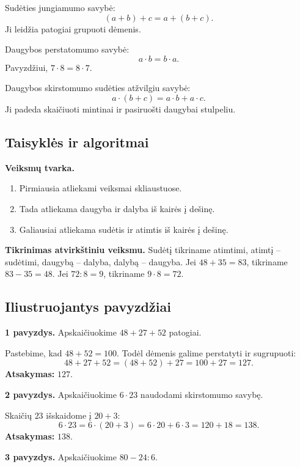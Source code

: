 \begin{savybe}
Sudėties jungiamumo savybė:
\[
(a+b)+c=a+(b+c).
\]
Ji leidžia patogiai grupuoti dėmenis.
\end{savybe}

\begin{savybe}
Daugybos perstatomumo savybė:
\[
a\cdot b=b\cdot a.
\]
Pavyzdžiui, \(7\cdot 8=8\cdot 7\).
\end{savybe}

\begin{savybe}
Daugybos skirstomumo sudėties atžvilgiu savybė:
\[
a\cdot(b+c)=a\cdot b+a\cdot c.
\]
Ji padeda skaičiuoti mintinai ir pasiruošti daugybai stulpeliu.
\end{savybe}

\subsection{Taisyklės ir algoritmai}

\textbf{Veiksmų tvarka.}
\begin{enumerate}[label=\arabic*.]
\item Pirmiausia atliekami veiksmai skliaustuose.
\item Tada atliekama daugyba ir dalyba iš kairės į dešinę.
\item Galiausiai atliekama sudėtis ir atimtis iš kairės į dešinę.
\end{enumerate}

\textbf{Tikrinimas atvirkštiniu veiksmu.}
Sudėtį tikriname atimtimi, atimtį -- sudėtimi, daugybą -- dalyba, dalybą -- daugyba. Jei \(48+35=83\), tikriname \(83-35=48\). Jei \(72:8=9\), tikriname \(9\cdot8=72\).

\subsection{Iliustruojantys pavyzdžiai}

\textbf{1 pavyzdys.} Apskaičiuokime \(48+27+52\) patogiai.

Pastebime, kad \(48+52=100\). Todėl dėmenis galime perstatyti ir sugrupuoti:
\[
48+27+52=(48+52)+27=100+27=127.
\]
\textbf{Atsakymas:} \(127\).

\textbf{2 pavyzdys.} Apskaičiuokime \(6\cdot 23\) naudodami skirstomumo savybę.

Skaičių \(23\) išskaidome į \(20+3\):
\[
6\cdot23=6\cdot(20+3)=6\cdot20+6\cdot3=120+18=138.
\]
\textbf{Atsakymas:} \(138\).

\textbf{3 pavyzdys.} Apskaičiuokime \(80-24:6\).

